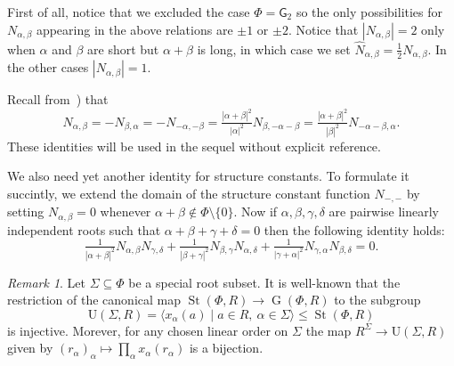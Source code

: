 \documentclass{article}
\numberwithin{equation}{section}
\theoremstyle{definition}
\theoremstyle{remark}
\newtheorem{rem}[lemma]{Remark}
\DeclareMathOperator\St{St}
\DeclareMathOperator\GG{G}
\begin{document}
First of all, notice that we excluded the case $\Phi=\mathsf{G}_2$ so the only possibilities for $N_{\alpha, \beta}$ appearing in the above relations are $\pm 1$ or $\pm 2$.
Notice that $|N_{\alpha,\beta}| = 2$ only when $\alpha$ and $\beta$ are short but $\alpha+\beta$ is long, in which case we set $\widehat{N}_{\alpha, \beta} = \frac{1}{2} N_{\alpha, \beta}$.
In the other cases $|N_{\alpha, \beta}| = 1$.

Recall from~\cite[\S~14]{VP}) that
\begin{equation} \label{eq:sc-ids-sl} N_{\alpha, \beta} = -N_{\beta,\alpha} = - N_{-\alpha, -\beta} = \tfrac{|\alpha+\beta|^2}{|\alpha|^2} N_{\beta, -\alpha-\beta} = \tfrac{|\alpha+\beta|^2}{|\beta|^2} N_{-\alpha-\beta, \alpha}. \end{equation}
These identities will be used in the sequel without explicit reference. 

We also need yet another identity for structure constants.
To formulate it succintly, we extend the domain of the structure constant function $N_{-,-}$ by setting $N_{\alpha, \beta} = 0$ whenever $\alpha+\beta\not\in\Phi\setminus\{0\}$.
Now if $\alpha, \beta, \gamma, \delta$ are pairwise linearly independent roots such that $\alpha+\beta+\gamma+\delta = 0$ then the following identity holds:
\begin{equation} \label{eq:cocycle} \tfrac{1}{|\alpha+\beta|^2} N_{\alpha,\beta} N_{\gamma,\delta} + \tfrac{1}{|\beta+\gamma|^2} N_{\beta,\gamma} N_{\alpha,\delta} + \tfrac{1}{|\gamma+\alpha|^2} N_{\gamma,\alpha} N_{\beta,\delta} = 0. \end{equation}

\begin{rem}\label{rem:uni-rad}
Let $\Sigma \subseteq \Phi$ be a special root subset. It is well-known that the restriction of the canonical map $\St(\Phi, R)\to\GG(\Phi, R)$ to the subgroup \[\mathrm{U}(\Sigma, R) = \langle x_{\alpha}(a) \mid a\in R,\ \alpha\in \Sigma \rangle \leq \St(\Phi, R)\] is injective. Morever, for any chosen linear order on \(\Sigma\) the map $R^{\Sigma} \to \mathrm{U}(\Sigma, R)$ given by $(r_\alpha)_\alpha \mapsto \prod_\alpha x_\alpha(r_\alpha)$ is a bijection. \end{rem}
\end{document}
